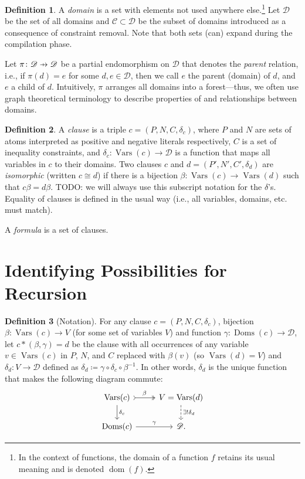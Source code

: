 \documentclass{article}
\theoremstyle{definition}
\newtheorem{definition}{Definition}
\newcommand\pfun{\mathrel{\ooalign{\hfil$\mapstochar\mkern5mu$\hfil\cr$\to$\cr}}}
\DeclareMathOperator{\dom}{dom}
\DeclareMathOperator{\Doms}{Doms}
\DeclareMathOperator{\Vars}{Vars}
\begin{document}
\begin{definition}
  A \emph{domain} is a set with elements not used anywhere else.\footnote{In the context of functions, the domain of a function $f$ retains its usual meaning and is denoted $\dom(f)$.} Let $\mathscr{D}$ be the set of all domains and $\mathscr{C} \subset \mathscr{D}$ be the subset of domains introduced as a consequence of constraint removal. Note that both sets (can) expand during the compilation phase.

Let $\pi\colon \mathscr{D} \pfun \mathscr{D}$ be a partial endomorphism on $\mathscr{D}$ that denotes the \emph{parent} relation, i.e., if $\pi(d) = e$ for some $d, e \in \mathscr{D}$, then we call $e$ the parent (domain) of $d$, and $e$ a child of $d$. Intuitively, $\pi$ arranges all domains into a forest---thus, we often use graph theoretical terminology to describe properties of and relationships between domains.
\end{definition}

\begin{definition}
  A \emph{clause} is a triple $c = (P, N, C, \delta_c)$, where $P$ and $N$ are sets of atoms interpreted as positive and negative literals respectively, $C$ is a set of inequality constraints, and $\delta_c\colon \Vars(c) \to \mathscr{D}$ is a function that maps all variables in $c$ to their domains. Two clauses $c$ and $d = (P', N', C', \delta_d)$ are \emph{isomorphic} (written $c \cong d$) if there is a bijection $\beta\colon \Vars(c) \to \Vars(d)$ such that $c\beta = d\beta$. TODO: we will always use this subscript notation for the $\delta$'s. Equality of clauses is defined in the usual way (i.e., all variables, domains, etc. must match).
\end{definition}

A \emph{formula} is a set of clauses.

\section{Identifying Possibilities for Recursion}

\begin{definition}[Notation]
  For any clause $c = (P, N, C, \delta_c)$, bijection $\beta\colon \Vars(c) \to V$ (for some set of variables $V$) and function $\gamma\colon \Doms(c) \to \mathscr{D}$, let $c \ast (\beta, \gamma) = d$ be the clause with all occurrences of any variable $v \in \Vars(c)$ in $P$, $N$, and $C$ replaced with $\beta(v)$ (so $\Vars(d) = V$) and $\delta_d\colon V \to \mathscr{D}$ defined as $\delta_d \coloneqq \gamma \circ \delta_c \circ \beta^{-1}$. In other words, $\delta_d$ is the unique function that makes the following diagram commute:
  \[
  \begin{tikzcd}
    \Vars(c) \ar[r, tail, two heads, "\beta"] \arrow{d}{\delta_c} & V = \Vars(d) \ar[d, dashed, "\exists!\delta_d"] \\
    \Doms(c) \arrow{r}{\gamma} & \mathscr{D}.
  \end{tikzcd}
  \]
\end{definition}
\end{document}
